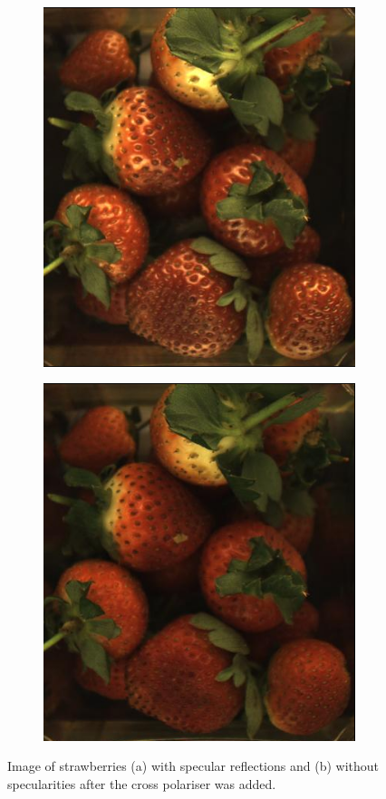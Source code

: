 \documentclass[fleqn,twoside,12pt]{report}
\begin{document}
\begin{figure}[ht]
	\centering
	\begin{subfigure}{.4\textwidth}
		\centering
		\includegraphics[width=.9\linewidth]{berries_spec.png}
		\caption{}
		\label{fig:berries_spec}
	\end{subfigure}%
	\begin{subfigure}{.4\textwidth}
		\centering
		\includegraphics[width=.9\linewidth]{berries_no_spec.png}
		\caption{}
		\label{fig:berries_no_spec}
	\end{subfigure}%
	\caption{Image of strawberries (a) with specular reflections and (b) without specularities after the cross polariser was added.}
	\label{}
\end{figure}
\end{document}
